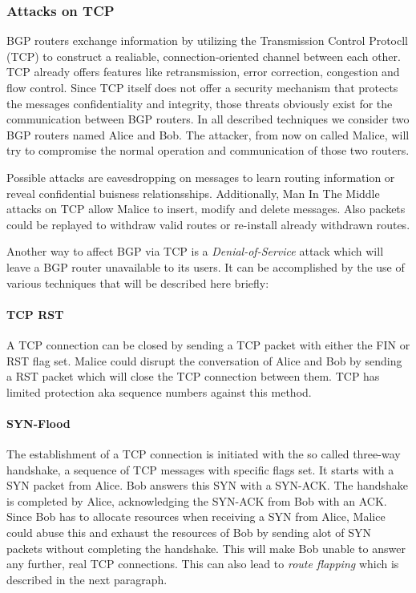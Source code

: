 \documentclass[12pt]{IEEEtran}
\begin{document}
	       	\subsubsection{Attacks on TCP}
		BGP routers exchange information by utilizing the Transmission Control Protocll (TCP) to construct a realiable, connection-oriented channel between each other. 
		TCP already offers features like retransmission, error correction, congestion and flow control. 
		Since TCP itself does not offer a security mechanism that protects the messages confidentiality and integrity, those threats obviously exist for the communication between BGP routers. 
		In all described techniques we consider two BGP routers named Alice and Bob. The attacker, from now on called Malice, will try to compromise the normal operation and communication of those two routers.

		Possible attacks are eavesdropping on messages to learn routing information or reveal confidential buisness relationsships.
		Additionally, Man In The Middle attacks on TCP allow Malice to insert, modify and delete messages. 
		Also packets could be replayed to withdraw valid routes or re-install already withdrawn routes.
	
		Another way to affect BGP via TCP is a \emph{Denial-of-Service} attack which will leave a BGP router unavailable to its users.
		It can be accomplished by the use of various techniques that will be described here briefly:
		\paragraph{TCP RST}
		A TCP connection can be closed by sending a TCP packet with either the FIN or RST flag set. 
		Malice could disrupt the conversation of Alice and Bob by sending a RST packet which will close the TCP connection between them. TCP has limited protection aka sequence numbers against this method. 

		\paragraph{SYN-Flood}
		The establishment of a TCP connection is initiated with the so called three-way handshake, a sequence of TCP messages with specific flags set. It starts with a SYN packet from Alice. Bob answers this SYN with a SYN-ACK. The handshake is completed by Alice, acknowledging the SYN-ACK from Bob with an ACK.
		Since Bob has to allocate resources when receiving a SYN from Alice, Malice could abuse this and exhaust the resources of Bob by sending alot of SYN packets without completing the handshake. This will make Bob unable to answer any further, real TCP connections. This can also lead to \emph{route flapping} which is described in the next paragraph.
\end{document}
